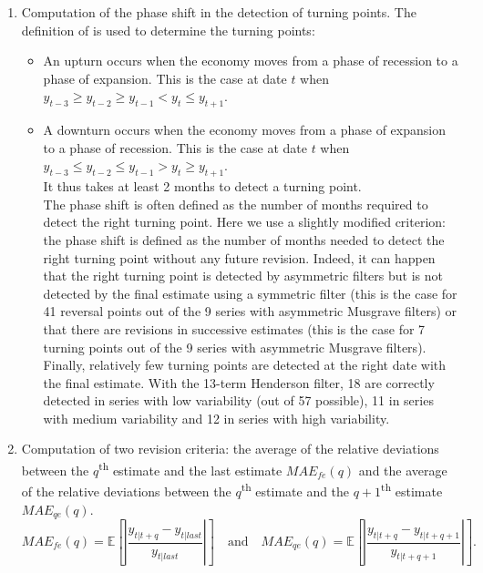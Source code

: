\documentclass[
]{article}
\providecommand{\tightlist}{%
  \setlength{\itemsep}{0pt}\setlength{\parskip}{0pt}}\usepackage{longtable,booktabs,array}
\newcommand\1{\mathds{1}}
\begin{document}
\begin{enumerate}
\def\labelenumi{\arabic{enumi}.}
\tightlist
\item
  Computation of the phase shift in the detection of turning points. The
  definition of \textcite{Zellner1991} is used to determine the turning
  points:

  \begin{itemize}
  \tightlist
  \item
    An upturn occurs when the economy moves from a phase of recession to
    a phase of expansion. This is the case at date \(t\) when
    \(y_{t-3}\geq y_{t-2}\geq y_{t-1}<y_t\leq y_{t+1}\).\\
  \item
    A downturn occurs when the economy moves from a phase of expansion
    to a phase of recession. This is the case at date \(t\) when
    \(y_{t-3}\leq y_{t-2}\leq y_{t-1}>y_t\geq y_{t+1}\).\\
    It thus takes at least 2 months to detect a turning point.\\
    The phase shift is often defined as the number of months required to
    detect the right turning point. Here we use a slightly modified
    criterion: the phase shift is defined as the number of months needed
    to detect the right turning point without any future revision.
    Indeed, it can happen that the right turning point is detected by
    asymmetric filters but is not detected by the final estimate using a
    symmetric filter (this is the case for 41 reversal points out of the
    9 series with asymmetric Musgrave filters) or that there are
    revisions in successive estimates (this is the case for 7 turning
    points out of the 9 series with asymmetric Musgrave filters).
    Finally, relatively few turning points are detected at the right
    date with the final estimate. With the 13-term Henderson filter, 18
    are correctly detected in series with low variability (out of 57
    possible), 11 in series with medium variability and 12 in series
    with high variability.
  \end{itemize}
\item
  Computation of two revision criteria: the average of the relative
  deviations between the \(q\)\textsuperscript{th} estimate and the last
  estimate \(MAE_{fe}(q)\) and the average of the relative deviations
  between the \(q\)\textsuperscript{th} estimate and the
  \(q+1\)\textsuperscript{th} estimate \(MAE_{qe}(q)\). \[
  MAE_{fe}(q)=\mathbb E\left[
  \left|\frac{
  y_{t|t+q} -  y_{t|last}
  }{
   y_{t|last}
  }\right|
  \right]
  \quad\text{and}\quad
  MAE_{qe}(q)=\mathbb E\left[
  \left|\frac{
  y_{t|t+q} - y_{t|t+q+1}
  }{
  y_{t|t+q+1}
  }\right|
  \right].
  \]
\end{enumerate}
\end{document}
